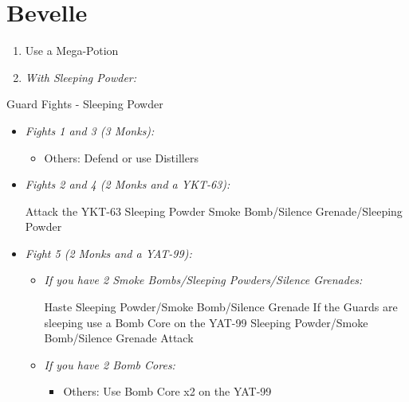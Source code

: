 \chapter{Bevelle}
\begin{enumerate}
    \item Use a Mega-Potion
    \item \textit{With Sleeping Powder:}
\end{enumerate}
\begin{battle}{Guard Fights - Sleeping Powder}
    \begin{itemize}
        \item \textit{Fights 1 and 3 (3 Monks):}
        \begin{itemize}
            \tidusf Attack
            \item Others: Defend or use Distillers
        \end{itemize}
        \item \textit{Fights 2 and 4 (2 Monks and a YKT-63):}
        \begin{itemize}
            \tidusf Attack the YKT-63
            \rikkuf Sleeping Powder
            \kimahrif Smoke Bomb/Silence Grenade/Sleeping Powder
        \end{itemize}
        \item \textit{Fight 5 (2 Monks and a YAT-99):}
        \begin{itemize}
            \item \textit{If you have 2 Smoke Bombs/Sleeping Powders/Silence Grenades:}
            \begin{itemize}
                \tidusf Haste \rikku
                \rikkuf Sleeping Powder/Smoke Bomb/Silence Grenade
                \rikkuf If the Guards are sleeping use a Bomb Core on the YAT-99
                \rikkuf Sleeping Powder/Smoke Bomb/Silence Grenade
                \tidusf Attack
            \end{itemize}
            \item \textit{If you have 2 Bomb Cores:}
            \begin{itemize}
                \tidusf Attack the Monks
                \item Others: Use Bomb Core x2 on the YAT-99
            \end{itemize}
        \end{itemize}
    \end{itemize}
\end{battle}
